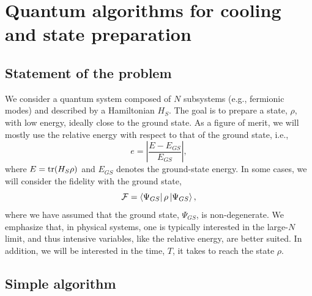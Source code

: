 \documentclass[aps,prx,twocolumn,superscriptaddress,nofootinbib,nolongbibliography,nobalancelastpage,10pt,floatfix]{revtex4-2}
\begin{document}
\section{Quantum algorithms for cooling and state preparation}
\label{sec:prelim}

\subsection{Statement of the problem}

We consider a quantum system composed of $N$ subsystems (e.g., fermionic modes) and described by a Hamiltonian $H_S$. The goal is to prepare a state, $\rho$, with low energy, ideally close to the ground state. As a figure of merit, we will mostly use the relative energy with respect to that of the ground state, i.e.,
\begin{equation}
    e = \left|\frac{E-E_{GS}}{E_{GS}}\right|,
    \label{eq:relative_energy}
\end{equation}
where $E=\operatorname{tr}(H_S \rho)$ and $E_{GS}$ denotes the ground-state energy. In some cases, we will consider the fidelity with the ground state,
\begin{equation}
    \mathcal{F}= \bra{\Psi_{GS}}\rho\ket{\Psi_{GS}},
    \label{eq:fidelity}
\end{equation}
where we have assumed that the ground state, $\Psi_{GS}$, is non-degenerate. We emphasize that, in physical systems, one is typically interested in the large-$N$ limit, and thus intensive variables, like the relative energy, are better suited. In addition, we will be interested in the time, $T$, it takes to reach the state $\rho$.

\subsection{Simple algorithm}
\end{document}
